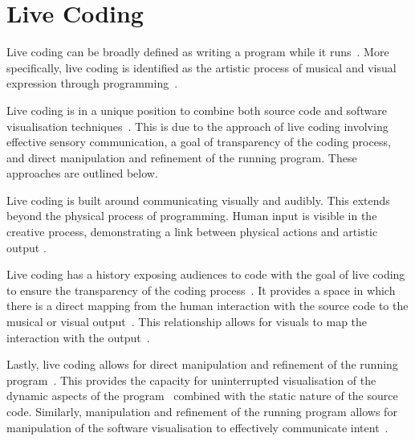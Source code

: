 
\section{Live Coding}

Live coding can be broadly defined as writing a program while it runs~\cite{Ward2004}. More specifically, live coding is identified as the artistic process of musical and visual expression through programming~\cite{Collins2003}.


Live coding is in a unique position to combine both source code and software visualisation techniques~\cite{McLean2010a}. This is due to the approach of live coding involving effective sensory communication, a goal of transparency of the coding process, and direct manipulation and refinement of the running program. These approaches are outlined below.

Live coding is built around communicating visually and audibly. This extends beyond the physical process of programming. Human input is visible in the creative process, demonstrating a link between physical actions and artistic output \cite{Mclean}.

Live coding has a history exposing audiences to code with the goal of live coding to ensure the transparency of the coding process~\cite{Collins2011,McLean2010a}. It provides a space in which there is a direct mapping from the human interaction with the source code to the musical or visual output~\cite{Mclean}. This relationship allows for visuals to map the interaction with the output~.

Lastly, live coding allows for direct manipulation and refinement of the running program~\cite{Swift2013}. This provides the capacity for uninterrupted visualisation of the dynamic aspects of the program~ combined with the static nature of the source code. Similarly, manipulation and refinement of the running program allows for manipulation of the software visualisation to effectively communicate intent~.

